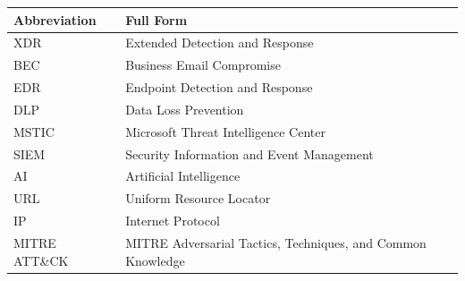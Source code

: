 \documentclass[10pt]{article}
\begin{document}
\begin{center}
\begin{tabular}{>{\raggedright\arraybackslash}p{} >{\raggedright\arraybackslash}p{}}
\toprule
\textbf{Abbreviation} & \textbf{Full Form} \\
\midrule
XDR & Extended Detection and Response \\
BEC & Business Email Compromise \\
EDR & Endpoint Detection and Response \\
DLP & Data Loss Prevention \\
MSTIC & Microsoft Threat Intelligence Center \\
SIEM & Security Information and Event Management \\
AI & Artificial Intelligence \\
URL & Uniform Resource Locator \\
IP & Internet Protocol \\
MITRE ATT\&CK & MITRE Adversarial Tactics, Techniques, and Common Knowledge \\
\bottomrule
\end{tabular}
\end{center}
\end{document}
